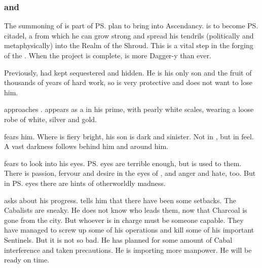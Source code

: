 \subsubsection[Psyrex and Vizsherioch]{\Psyrex and \Vizsherioch}
%
The summoning of \Nithdornazsh{} is part of \ps{\Secherdamon} plan to bring  into Ascendancy. 
\Nithdornazsh{} is to become \ps{\Vizsherioch} citadel, a \nexus{} from which he can grow strong and spread his tendrils (politically and metaphysically) into the Realm of the Shroud. 
This is a vital step in the forging of the . 
When the \Nithdornazsh{} project is complete, \Vizsherioch{} is more Dagger-y than ever. 

Previously, \Secherdamon{} had kept \Vizsherioch{} sequestered and hidden. 
He is his only son and the fruit of thousands of years of hard work, so \Secherdamon{} is very protective and does not want to lose him. 

\Vizsherioch approaches \LocarPsyrex.
\Vizsherioch appears as a \dax in his prime, with pearly white scales, wearing a loose robe of white, silver and gold. 

\Psyrex fears him. 
Where \Secherdamon is fiery bright, his son \Vizsherioch is dark and sinister. 
Not in \colour, but in feel. 
A vast darkness follows behind him and around him. 

\Psyrex fears to look into his eyes. 
\ps{\Secherdamon} eyes are terrible enough, but \Psyrex is used to them. 
There is passion, fervour and desire in the eyes of \Secherdamon, and anger and hate, too. 
But in \ps{\Vizsherioch} eyes there are hints of otherworldly madness. 

\Vizsherioch asks \Psyrex about his progress. 
\Psyrex tells him that there have been some setbacks. 
The Cabalists are sneaky.
He does not know who leads them, now that Charcoal is gone from the city. 
But whoever is in charge must be someone capable. 
They have managed to screw up some of his operations and kill some of his important Sentinels. 
But it is not so bad. 
He has planned for some amount of Cabal interference and taken precautions. 
He is importing more manpower. 
He will be ready on time. 

